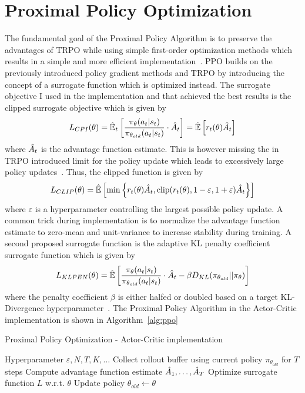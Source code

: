 \section{Proximal Policy Optimization}\label{sec:proximal-policy-optimization}
The fundamental goal of the Proximal Policy Algorithm is to preserve the advantages of TRPO while using simple first-order
optimization methods which results in a simple and more efficient implementation~\cite{schulman2017ppo}.
PPO builds on the previously introduced policy gradient methods and TRPO by introducing the concept of a surrogate function
which is optimized instead.
The surrogate objective I used in the implementation and that achieved the best results is the clipped surrogate objective
which is given by
\begin{equation}
    L_{CPI}(\theta) = \Hat{\mathbb{E}}_t \left[ \frac{\pi_\theta(a_t | s_t)}{\pi_{\theta_{old}}(a_t | s_t)}\cdot \Hat{A}_t \right] = \Hat{\mathbb{E}}\left[ r_t(\theta)\Hat{A}_t \right]
\end{equation}
where $\Hat{A}_t$ is the advantage function estimate.
This is however missing the in TRPO introduced limit for the policy update which leads to excessively
large policy updates~\cite{schulman2017ppo}.
Thus, the clipped function is given by
\begin{equation}
    L_{CLIP}(\theta) = \Hat{\mathbb{E}}\left[ \min\left\{ r_t(\theta)\Hat{A}_t, \operatorname{clip}(r_t(\theta), 1-\varepsilon, 1+\varepsilon) \Hat{A}_t \right\} \right]
\end{equation}
where $\varepsilon$ is a hyperparameter controlling the largest possible policy update.
A common trick during implementation is to normalize the advantage function estimate to zero-mean and unit-variance to
increase stability during training.
A second proposed surrogate function is the adaptive KL penalty coefficient surrogate function which is given by
\begin{equation}
    L_{KLPEN}(\theta) = \Hat{\mathbb{E}}\left[ \frac{\pi_\theta(a_t | s_t)}{\pi_{\theta_{old}}(a_t | s_t)}\cdot \Hat{A}_t - \beta D_{KL}(\pi_{\theta_{old}} || \pi_\theta) \right]
\end{equation}
where the penalty coefficient $\beta$ is either halfed or doubled based on a target KL-Divergence hyperparameter~\cite{schulman2017ppo}.
The Proximal Policy Algorithm in the Actor-Critic implementation is shown in Algorithm~\ref{alg:ppo}~\cite{schulman2017ppo}
\begin{algorithm}
\caption{Proximal Policy Optimization - Actor-Critic implementation}\label{alg:ppo}
    \begin{algorithmic}
        \Require  Hyperparameter $\varepsilon, N, T, K, \dots$
            \State Collect rollout buffer using current policy $\pi_{\theta_{old}}$ for $T$ steps
            \State Compute advantage function estimate $\Hat{A}_1, \dots, \Hat{A}_T$
        \EndFor
            \State Optimize surrogate function $L$ w.r.t. $\theta$
            \State Update policy $\theta_{old} \leftarrow \theta$
        \EndFor
        \EndWhile
    \end{algorithmic}
\end{algorithm}
